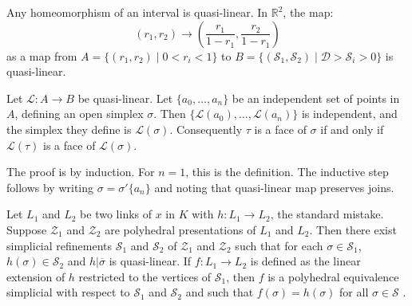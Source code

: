 \begin{example*}
Any homeomorphism of an interval is quasi-linear. In $\mathbb{R}^{2}$, the map: 
$$
(r_{1},r_{2})\to \left(\frac{r_{1}}{1-r_{1}},\frac{r_{2}}{1-r_{1}}\right)
$$
as a map from $A=\{(r_{1},r_{2})\mid 0<r_{i}<1\}$ to $B=\{(\mathscr{S}_{1},\mathscr{S}_{2})\mid \mathscr{D}>\mathscr{S}_{i}>0\}$ is quasi-linear.
\end{example*}

\begin{proposition}\label{chap4-prop4.3.14}
Let $\mathcal{L}:A\to B$ be quasi-linear. Let $\{a_{0},\ldots,a_{n}\}$ be an independent set of points in $A$, defining an open simplex $\sigma$. Then $\{\mathcal{L}(a_{0}),\ldots, \mathcal{L}(a_{n})\}$ is independent, and the simplex they define is $\mathcal{L}(\sigma)$. Consequently $\tau$ is a face of $\sigma$ if and only if $\mathcal{L}(\tau)$ is a face of $\mathcal{L}(\sigma)$.
\end{proposition}

The proof is by induction. For $n=1$, this is the definition. The inductive step follows by writing $\sigma=\sigma'\{a_{n}\}$ and noting that quasi-linear map preserves joins.

\begin{theorem}\label{chap4-thm4.3.15}
Let $L_{1}$ and $L_{2}$ be two links of $x$ in $K$ with $h:L_{1}\to L_{2}$, the standard mistake. Suppose $\mathscr{Z}_{1}$ and $\mathscr{Z}_{2}$ are polyhedral presentations of $L_{1}$ and $L_{2}$. Then there exist simplicial refinements $\mathscr{S}_{1}$ and $\mathscr{S}_{2}$ of $\mathscr{Z}_{1}$ and $\mathscr{Z}_{2}$ such that for each $\sigma\in \mathscr{S}_{1}$, $h(\sigma)\in \mathscr{S}_{2}$ and $h|\overline{\sigma}$ is quasi-linear. If $f:L_{1}\to L_{2}$ is defined as the linear extension of $h$ restricted to the vertices of $\mathscr{S}_{1}$, then $f$ is a polyhedral equivalence simplicial with respect to $\mathscr{S}_{1}$ and $\mathscr{S}_{2}$ and such that $f(\sigma)=h(\sigma)$ for all $\sigma\in \mathscr{S}$ .
\end{theorem}

